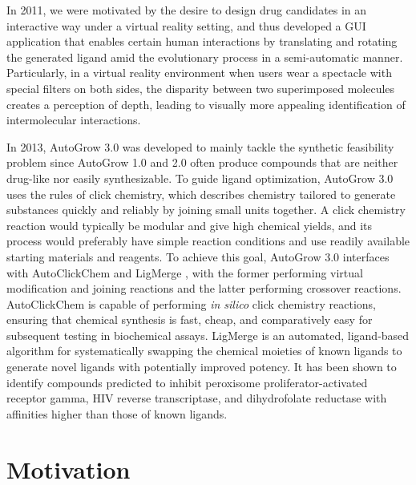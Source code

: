 In 2011, we were motivated by the desire to design drug candidates in an interactive way under a virtual reality setting, and thus developed a GUI application \citep{1265} that enables certain human interactions by translating and rotating the generated ligand amid the evolutionary process in a semi-automatic manner. Particularly, in a virtual reality environment when users wear a spectacle with special filters on both sides, the disparity between two superimposed molecules creates a perception of depth, leading to visually more appealing identification of intermolecular interactions.

In 2013, AutoGrow 3.0 \citep{1354} was developed to mainly tackle the synthetic feasibility problem since AutoGrow 1.0 and 2.0 often produce compounds that are neither drug-like nor easily synthesizable. To guide ligand optimization, AutoGrow 3.0 uses the rules of click chemistry, which describes chemistry tailored to generate substances quickly and reliably by joining small units together. A click chemistry reaction would typically be modular and give high chemical yields, and its process would preferably have simple reaction conditions and use readily available starting materials and reagents. To achieve this goal, AutoGrow 3.0 interfaces with AutoClickChem \citep{1051} and LigMerge \citep{1181}, with the former performing virtual modification and joining reactions and the latter performing crossover reactions. AutoClickChem \citep{1051} is capable of performing \textit{in silico} click chemistry reactions, ensuring that chemical synthesis is fast, cheap, and comparatively easy for subsequent testing in biochemical assays. LigMerge \citep{1181} is an automated, ligand-based algorithm for systematically swapping the chemical moieties of known ligands to generate novel ligands with potentially improved potency. It has been shown to identify compounds predicted to inhibit peroxisome proliferator-activated receptor gamma, HIV reverse transcriptase, and dihydrofolate reductase with affinities higher than those of known ligands.%

\section{Motivation}

